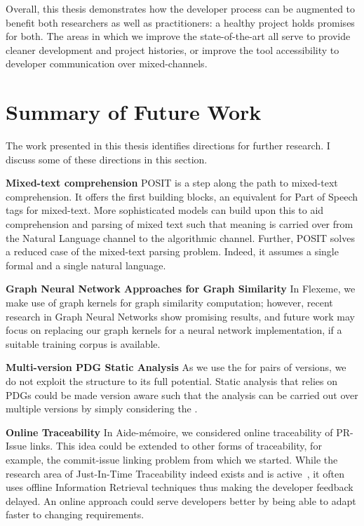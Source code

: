 Overall, this thesis demonstrates how the developer process can be augmented to
benefit both researchers as well as practitioners: a healthy project holds
promises for both. The areas in which we improve the state-of-the-art all serve
to provide cleaner development and project histories, or improve the tool
accessibility to developer communication over mixed-channels. 

\section{Summary of Future Work}
The work presented in this thesis identifies directions for further research. I discuss some of these directions in this section.

\textbf{Mixed-text comprehension}
POSIT is a step along the path to mixed-text comprehension. It offers the first
building blocks, an equivalent for Part of Speech tags for mixed-text. More
sophisticated models can build upon this to aid comprehension and parsing of
mixed text such that meaning is carried over from the Natural Language channel
to the algorithmic channel. Further, POSIT solves a reduced case of the
mixed-text parsing problem. Indeed, it assumes a single formal and a single
natural language. 

\textbf{Graph Neural Network Approaches for Graph Similarity}
In Flexeme, we make use of graph kernels for graph similarity computation;
however, recent research in Graph Neural Networks show promising results, and
future work may focus on replacing our graph kernels for a neural network
implementation, if a suitable training corpus is available.

\textbf{Multi-version PDG Static Analysis}
As we use the \deltaPDG for pairs of versions, we do not exploit the structure
to its full potential. Static analysis that relies on PDGs could be made version
aware such that the analysis can be carried out over multiple versions by simply
considering the \deltaPDG.

\textbf{Online Traceability}
In Aide-mémoire, we considered online traceability of PR-Issue links. This idea
could be extended to other forms of traceability, for example, the commit-issue
linking problem from which we started. While the research area of Just-In-Time
Traceability indeed exists and is active~\cite{hayes2003improving,
lin2006poirot, lucia2007recovering, cleland2007best}, it often uses offline
Information Retrieval techniques thus making the developer feedback delayed. An
online approach could serve developers better by being able to adapt faster to
changing requirements.